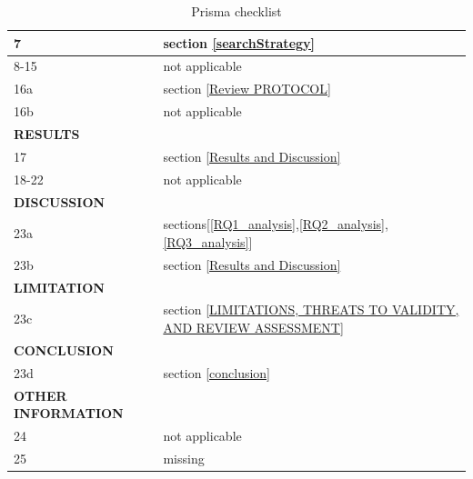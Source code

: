 \begin{table}[]
\begin{tabular}{|ll|l|}
\multicolumn{2}{|l|}{7}                                      & section \ref{searchStrategy}                                          \\ \hline
\multicolumn{2}{|l|}{8-15}                                   & not applicable                                                \\ \hline
\multicolumn{2}{|l|}{16a}                                    & section \ref{Review PROTOCOL}                                                        \\ \hline
\multicolumn{2}{|l|}{16b}                                    & not applicable                                                \\ \hline
\multicolumn{2}{|l|}{\textbf{RESULTS}}                       &                                                               \\ \hline
\multicolumn{2}{|l|}{17}                                     & section \ref{Results and Discussion}                                                    \\ \hline
\multicolumn{2}{|l|}{18-22}                                  & not applicable                                                \\ \hline
\multicolumn{2}{|l|}{\textbf{DISCUSSION}}                    &                                                               \\ \hline
\multicolumn{2}{|l|}{23a}                                    & sections[\ref{RQ1_analysis},\ref{RQ2_analysis},\ref{RQ3_analysis}]                                             \\ \hline
\multicolumn{2}{|l|}{23b}                                    & section \ref{Results and Discussion}                                               \\ \hline
\multicolumn{2}{|l|}{\textbf{LIMITATION}}                   &                                                               \\ \hline
\multicolumn{2}{|l|}{23c}                                    & section \ref{LIMITATIONS, THREATS TO VALIDITY, AND REVIEW ASSESSMENT}                                                 \\ \hline
\multicolumn{2}{|l|}{\textbf{CONCLUSION}}                    &                                                               \\ \hline
\multicolumn{2}{|l|}{23d}                                    & section \ref{conclusion}                                                 \\ \hline
\multicolumn{2}{|l|}{\textbf{OTHER INFORMATION}}             &                                                               \\ \hline
\multicolumn{2}{|l|}{24}                                     & not applicable                                                \\ \hline
\multicolumn{2}{|l|}{25}                                     & missing \\ \hline
\end{tabular}
\caption{Prisma checklist}
\label{Prisma checklist}
\end{table}

